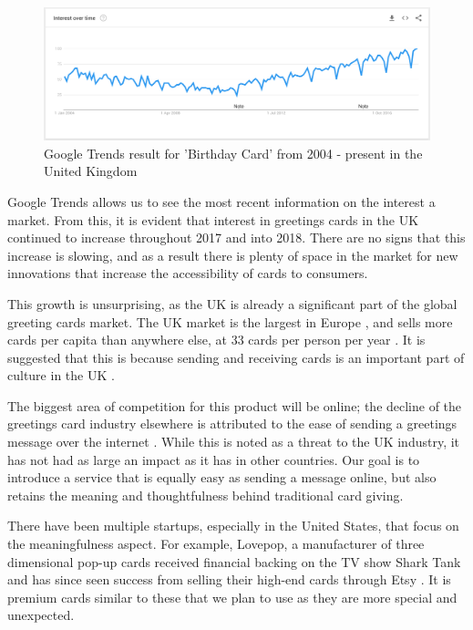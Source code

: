 \documentclass[10pt, a4paper]{article}
\begin{document}
  \begin{figure}
    \includegraphics[width=\textwidth]{birthday_cards_google_trends.png}
    \caption{Google Trends result for 'Birthday Card' from 2004 - present in the United Kingdom}
    \label{fig:google_trends}
  \end{figure}

Google Trends allows us to see the most recent information on the interest a market. From this, it is evident that interest in greetings cards in the UK continued to increase throughout 2017 and into 2018. There are no signs that this increase is slowing, and as a result there is plenty of space in the market for new innovations that increase the accessibility of cards to consumers.

This growth is unsurprising, as the UK is already a significant part of the global greeting cards market. The UK market is the largest in Europe \citep{strategyr}, and sells more cards per capita than anywhere else, at 33 cards per person per year \citep{greetingcardassociation}. It is suggested that this is because sending and receiving cards is an important part of culture in the UK \citep{greetingcardassociation}.

The biggest area of competition for this product will be online; the decline of the greetings card industry elsewhere is attributed to the ease of sending a greetings message over the internet \citep{npr}. While this is noted as a threat to the UK industry, it has not had as large an impact as it has in other countries\citep{mintel}. Our goal is to introduce a service that is equally easy as sending a message online, but also retains the meaning and thoughtfulness behind traditional card giving.

There have been multiple startups, especially in the United States, that focus on the meaningfulness aspect. For example, Lovepop, a manufacturer of three dimensional pop-up cards received financial backing on the TV show Shark Tank \citep{americaninno} and has since seen success from selling their high-end cards through Etsy \citep{Etsy}. It is premium cards similar to these that we plan to use as they are more special and unexpected.
\end{document}
